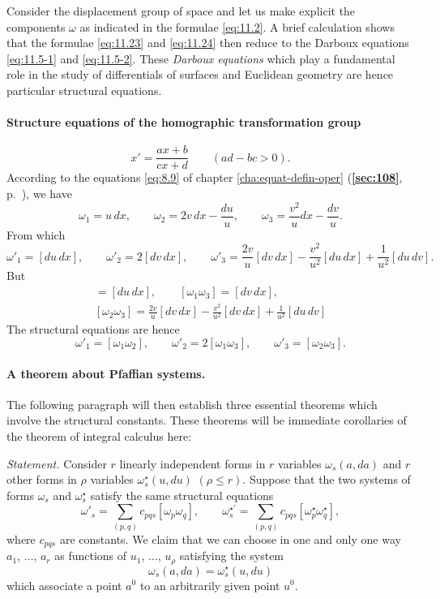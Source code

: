 \documentclass[leqno,11pt]{book}
\numberwithin{equation}{chapter}
\theoremstyle{shape1}
\theoremstyle{shapesmall}
\newcommand{\fsref}[1]{{\rm\textsection\textbf{\ref{sec:#1}}}}
\newcommand{\str}{^{\star}}
\newcommand{\somespace}{\vspace{9pt}}
\begin{document}
Consider the displacement group of space and let us make explicit the components $\omega$ as indicated in the formulae \eqref{eq:11.2}. A brief calculation shows that the formulae \eqref{eq:11.23} and \eqref{eq:11.24} then reduce to the Darboux equations \eqref{eq:11.5-1} and \eqref{eq:11.5-2}. These \emph{Darboux equations} which play a fundamental role in the study of differentials of surfaces and Euclidean geometry are hence particular structural equations.

\paragraph{Structure equations of the homographic transformation group}
\label{sec:161}
\[
x'=\frac{ax+b}{cx+d}\qquad(ad-bc>0).
\]
According to the equations \eqref{eq:8.9} of chapter \ref{cha:equat-defin-oper} (\fsref{108}, p.~\pageref{sec:108}), we have
\[
\omega_{1}=u\,dx,\qquad\omega_{2}=2v\,dx-\frac{du}{u},\qquad\omega_{3}=\frac{v^{2}}{u}dx-\frac{dv}{u}.
\]
From which
\[
\omega'_{1}=[du\,dx],\qquad\omega'_{2}=2[dv\,dx],\qquad\omega'_{3}=\frac{2v}{u}[dv\,dx]-\frac{v^{2}}{u^{2}}[du\,dx]+\frac{1}{u^{2}}[du\,dv].
\]
But
\begin{gather*}
  [\omega_{1}\omega_{2}]=[du\,dx],\qquad[\omega_{1}\omega_{3}]=[dv\,dx],\\
  [\omega_{2}\omega_{3}]=\frac{2v}{u}[dv\,dx]-\frac{v^{2}}{u^{2}}[dv\,dx]+\frac{1}{u^{2}}[du\,dv]
\end{gather*}
The structural equations are hence
\begin{equation}
  \label{eq:11.28}
  \omega'_{1}=[\omega_{1}\omega_{2}],\qquad\omega'_{2}=2[\omega_{1}\omega_{3}],\qquad\omega'_{3}=[\omega_{2}\omega_{3}].
\end{equation}

\paragraph{A theorem about Pfaffian systems.}
\label{sec:162}
The following paragraph will then establish three essential theorems which involve the structural constants. These theorems will be immediate corollaries of the theorem of integral calculus here:

\somespace

\emph{Statement.} Consider $r$ linearly independent forms in $r$ variables $\omega_{s}(a,da)$ and $r$ other forms in $\rho$ variables $\omega_{s}\str(u,du)$ $(\rho\le r)$. Suppose that the two systems of forms $\omega_{s}$ and $\omega_{s}\str$ satisfy the same structural equations
\[
\omega'_{s}=\sum_{(p,q)}c_{pqs}[\omega_{p}\omega_{q}],\qquad
\omega^{\star\prime}_{s}=\sum_{(p,q)}c_{pqs}[\omega\str_{p}\omega\str_{q}],
\]
where $c_{pqs}$ are constants. We claim that we can choose in one and only one way $a_{1}$, $\dots$, $a_{r}$ as functions of $u_{1}$, $\dots$, $u_{\rho}$ satisfying the system
\begin{equation}
  \label{eq:11.29}
  \omega_{s}(a,da)=\omega\str_{s}(u,du)
\end{equation}
which associate a point $a^{0}$ to an arbitrarily given point $u^{0}$.
\end{document}
